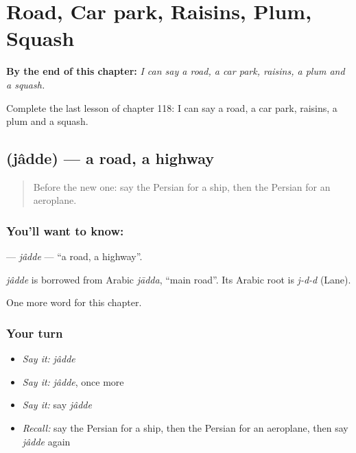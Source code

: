 
\chapter{Road, Car park, Raisins, Plum, Squash}
\label{ch:fa-road-car-park-raisins-plum-squash}

\begin{chapteropening}
\textbf{By the end of this chapter:} \emph{I can say a road, a car park, raisins, a plum and a squash.}

Complete the last lesson of chapter 118: I can say a road, a car park, raisins, a plum and a squash.
\end{chapteropening}

\section[\texorpdfstring{\fa{جاده} (jâdde)}{جاده (jâdde)}]{ (jâdde) — a road, a highway}

\label{lesson:FA-C118-jadde}



\begin{quote}
Before the new one: say the Persian for a ship, then the Persian for an aeroplane.
\end{quote}

\subsection*{You'll want to know: }
\textbf{} — \emph{jâdde} — \textquotedblleft{}a road, a highway\textquotedblright{}.

\begin{cousinweb}
\emph{jâdde} is borrowed from Arabic \emph{jādda}, \textquotedblleft{}main road\textquotedblright{}. Its Arabic root is \emph{j-d-d} (Lane).
\end{cousinweb}

\begin{grammarlens}[title={What you've built}]
One more word for this chapter.
\end{grammarlens}

\subsection*{Your turn}
\begin{itemize}
\raggedright
  \item \emph{Say it:} \emph{jâdde}
  \item \emph{Say it:} \emph{jâdde}, once more
  \item \emph{Say it:} say \emph{jâdde}
  \item \emph{Recall:} say the Persian for a ship, then the Persian for an aeroplane, then say \emph{jâdde} again
\end{itemize}

